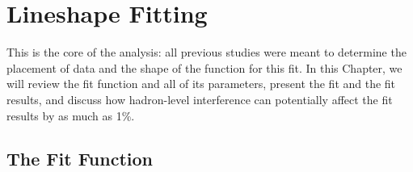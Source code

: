 \documentclass{cornell}
\begin{document}
\chapter{Lineshape Fitting}
\label{chp:fitting}

This is the core of the analysis: all previous studies were meant to
determine the placement of data and the shape of the function for this
fit.  In this Chapter, we will review the fit function and all of its
parameters, present the fit and the fit results, and discuss how
hadron-level interference can potentially affect the fit results by as
much as 1\%.

\section{The Fit Function}
\label{sec:fitfunction}
\end{document}
